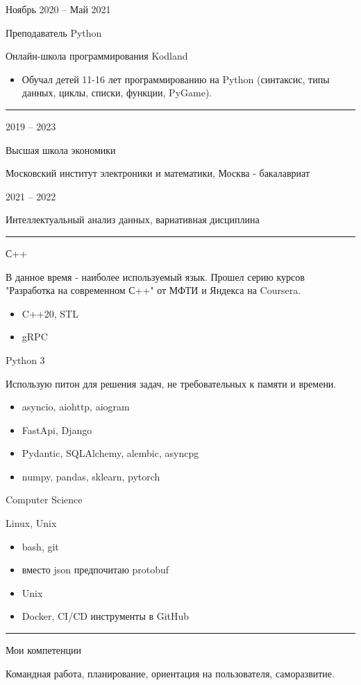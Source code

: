 \documentclass[a4paper,10pt]{article}
\newlength{\cvcolumngapwidth}
\newlength{\cvleftcolumnwidth}
\newlength{\cvrightcolumnwidth}
\newcommand{\cvsectionstyle}[1]{{\normalsize\cvsectionfont\textcolor{cvsectioncolor}{#1}}}
\newcommand{\cvtitlestyle}[1]{{\large\cvtitlefont\textcolor{cvtitlecolor}{#1}}}
\newcommand{\cvdurationstyle}[1]{{\small\cvdurationfont\textcolor{cvdurationcolor}{#1}}}
\newcommand{\cvheadingstyle}[1]{{\normalsize\cvheadingfont\textcolor{cvheadingcolor}{#1}}}
\newlength{\cvafteritemskipamount}
\newlength{\cvaftersectionskipamount}
\newlength{\cvbetweensectionandheadingextraskipamount}
\newlength{\cvaftertitleskipamount}
\newlength{\cvparskip}
\newcommand{\cvsection}[1]{
    \begin{minipage}[t]{\cvleftcolumnwidth}
        \raggedleft\cvsectionstyle{#1}
    \end{minipage}%
    \hspace{\cvcolumngapwidth}%
    \begin{minipage}[t]{\cvrightcolumnwidth}
        \textcolor{cvrulecolor}{\rule{\cvrightcolumnwidth}{0.3mm}}
    \end{minipage}

    \vspace{\cvaftersectionskipamount}
}
\newcommand{\cvitem}[2]{
    \begin{minipage}[t]{\cvleftcolumnwidth}
        \raggedleft #1
    \end{minipage}%
    \hspace{\cvcolumngapwidth}%
    \begin{minipage}[t]{\cvrightcolumnwidth}
        \setlength{\parskip}{\cvparskip} #2
    \end{minipage}

    \vspace{\cvafteritemskipamount}
}
\newcommand{\cvtitle}[1]{
    \cvtitlestyle{#1}

    \vspace{\cvaftertitleskipamount}
    \vspace{-\cvparskip}
}
\begin{document}
\cvitem{
    \cvdurationstyle{Ноябрь 2020 -- Май 2021}
}{
    \cvtitle{Преподаватель Python}

    Онлайн-школа программирования Kodland

    \begin{itemize}[leftmargin=*]
        \item Обучал детей 11-16 лет программированию на Python (синтаксис, типы данных, циклы, списки, функции, PyGame).
    \end{itemize}
}



\cvsection{Образование}

\cvitem{
    \cvdurationstyle{2019 -- 2023}
}{
    \cvtitle{Высшая школа экономики}

    Московский институт электроники и математики, Москва - бакалавриат
}

\cvitem{
    \cvdurationstyle{2021 -- 2022}
}{
    Интеллектуальный анализ данных, вариативная дисциплина

}


\cvsection{Навыки}

\vspace{\cvbetweensectionandheadingextraskipamount}

\cvitem{
    \cvheadingstyle{С++}
}{
    В данное время - наиболее используемый язык. Прошел серию курсов "Разработка на современном С++" от МФТИ и Яндекса на Coursera.
    \begin{itemize}
        \item C++20, STL
        \item gRPC
    \end{itemize}
}

\cvitem{
    \cvheadingstyle{Python 3}
}{
    Использую питон для решения задач, не требовательных к памяти и времени.
    \begin{itemize}
        \item asyncio, aiohttp, aiogram
        \item FastApi, Django
        \item Pydantic, SQLAlchemy, alembic, asyncpg
        \item numpy, pandas, sklearn, pytorch
    \end{itemize}
}

\cvitem{
    \cvheadingstyle{Computer Science}
}{
    Linux, Unix
    \begin{itemize}
        \item bash, git
        \item вместо json предпочитаю protobuf
        \item Unix
        \item Docker, CI/CD инструменты в GitHub
    \end{itemize}
}



\cvsection{}

\vspace{\cvbetweensectionandheadingextraskipamount}

\cvitem{
    \cvheadingstyle{Мои компетенции}
}{
    Командная работа, планирование, ориентация на пользователя, саморазвитие.
}
\end{document}
